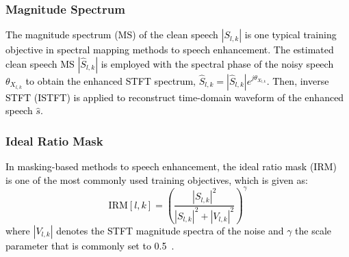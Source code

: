 \documentclass[journal]{IEEEtran}
\begin{document}


\subsubsection{Magnitude Spectrum}
\textcolor{black}{The magnitude spectrum (MS) of the clean speech $\left|S_{l,k}\right|$ is one typical training objective in spectral mapping methods to speech enhancement. The estimated clean speech MS $|\widehat{S}_{l,k}|$ is employed with the spectral phase of the noisy speech $\theta_{X_{l,k}}$ to obtain the enhanced STFT spectrum, $\widehat{S}_{l,k}\!=\!|\widehat{S}_{l,k}|e^{j\theta_{X_{l,k}}}$. Then, inverse STFT (ISTFT) is applied to reconstruct time-domain waveform of the enhanced speech $\widehat{s}$.}


\subsubsection{Ideal Ratio Mask}

\textcolor{black}{In masking-based methods to speech enhancement, the ideal ratio mask (IRM)~\cite{targets} is one of the most commonly used training objectives, which is given as:
\begin{equation}\label{IRM}
\text{IRM}[l,k]=\left(\frac{|S_{l,k}|^{2}}{|S_{l,k}|^{2}+|V_{l, k}|^{2}}\right)^{\gamma}
\end{equation}
where $\left|V_{l,k}\right|$ denotes the STFT magnitude spectra of the noise and $\gamma$ the scale parameter that is commonly set to 0.5~\cite{overview2018}.}

\end{document}
